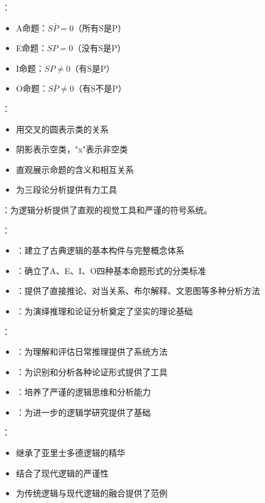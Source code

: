 {\begin{theorembox}[title=5.7 符号系统与文恩图]
：
\begin{itemize}
  \item A命题：$S\bar{P}=0$（所有S是P）
  \item E命题：$SP=0$（没有S是P）
  \item I命题：$SP \neq 0$（有S是P）
  \item O命题：$S\bar{P} \neq 0$（有S不是P）
\end{itemize}

：
\begin{itemize}
  \item 用交叉的圆表示类的关系
  \item 阴影表示空类，"x"表示非空类
  \item 直观展示命题的含义和相互关系
  \item 为三段论分析提供有力工具
\end{itemize}

：为逻辑分析提供了直观的视觉工具和严谨的符号系统。
\end{theorembox}

\begin{examplebox}[title=第五章的理论意义与实践价值]
：
\begin{itemize}
  \item {}：建立了古典逻辑的基本构件与完整概念体系
  \item {}：确立了A、E、I、O四种基本命题形式的分类标准
  \item {}：提供了直接推论、对当关系、布尔解释、文恩图等多种分析方法
  \item {}：为演绎推理和论证分析奠定了坚实的理论基础
\end{itemize}

：
\begin{itemize}
  \item {}：为理解和评估日常推理提供了系统方法
  \item {}：为识别和分析各种论证形式提供了工具
  \item {}：培养了严谨的逻辑思维和分析能力
  \item {}：为进一步的逻辑学研究提供了基础
\end{itemize}

：
\begin{itemize}
  \item 继承了亚里士多德逻辑的精华
  \item 结合了现代逻辑的严谨性
  \item 为传统逻辑与现代逻辑的融合提供了范例
\end{itemize}
\end{examplebox}

}
